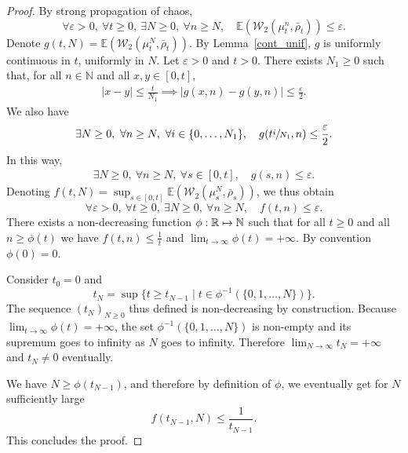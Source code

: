 \documentclass[10pt]{amsart}
\newcommand\mto{\mathchoice{\longmapsto}{\mapsto}{\mapsto}{\mapsto}}
\let\epsilon\varepsilon
\let\sep\mid
\theoremstyle{plain}
\theoremstyle{definition}
\begin{document}
\begin{proof}
By strong propagation of chaos,
\begin{equation}\label{Conv_non_unif_base}
\forall \epsilon>0,\ \forall t\geq0,\ \exists N\geq0,\ \forall n\geq N,\quad \mathbb{E}\left(\mathcal{W}_2\left(\mu^n_{t},\bar{\rho}_{t}\right)\right)\leq \epsilon.
\end{equation}
Denote $g(t,N)=\mathbb{E}\left(\mathcal{W}_2\left(\mu^N_{t},\bar{\rho}_{t}\right)\right)$. By Lemma~\ref{cont_unif}, $g$ is uniformly continuous in $t$, uniformly in $N$. Let $\epsilon>0$ and $t>0$. There exists $N_1\geq0$ such that, for all $n\in\mathbb{N}$ and all $x,y\in[0,t]$,
\begin{align*}
|x-y|\leq\frac{t}{N_1}\implies |g(x,n)-g(y,n)|\leq\frac{\epsilon}{2}.
\end{align*}
We also have\vspace*{-3pt}
\[
\exists N\geq0,\ \forall n\geq N,\ \forall i\in \{0,\dots,N_1\},\quad g(t\sfrac{i}{N_1},n)\leq \frac{\epsilon}{2}.
\]
In this way,\vspace*{-3pt}
\begin{align*}
\exists N\geq0,\ \forall n\geq N,\ \forall s\in [0,t],\quad g(s,n)\leq \epsilon.
\end{align*}
Denoting $f(t,N)=\sup_{s\in[0,t]}\mathbb{E}\left(\mathcal{W}_2\left(\mu^N_{s},\bar{\rho}_{s}\right)\right)$, we thus obtain
\begin{equation}\label{Conv_non_unif_sup}
\forall \epsilon>0,\ \forall t\geq0,\ \exists N\geq0,\ \forall n\geq N,\quad f(t,n)\leq \epsilon.
\end{equation}
There exists a non-decreasing function $\phi:\mathbb{R}\mto \mathbb{N}$ such that for all $t\geq0$ and all $n\geq \phi(t)$ we have $f(t,n)\leq\frac{1}{t}$ and $\lim_{t\to\infty}\phi(t)=+\infty$. By convention $\phi(0)=0$.

Consider $t_0=0$ and\vspace*{-3pt}
\[ t_N=\sup\{t\geq t_{N-1}\sep t\in\phi^{-1}(\{0,1,\dots,N\})\}.
\]
The sequence $(t_N)_{N\geq0}$ thus defined is non-decreasing by construction. Because $\lim_{t\to\infty}\phi(t)=+\infty$, the set $\phi^{-1}(\{0,1,\dots,N\})$ is non-empty and its supremum goes to infinity as $N$ goes to infinity. Therefore $\lim_{N\to\infty}t_N=+\infty$ and $t_N\neq0$ eventually.

We have $N\geq\phi(t_{N-1})$, and therefore by definition of $\phi$, we eventually get for $N$ sufficiently large\vspace*{-3pt}
\[
f(t_{N-1},N)\leq\frac{1}{t_{N-1}}.
\]
This concludes the proof.
\end{proof}
\end{document}
